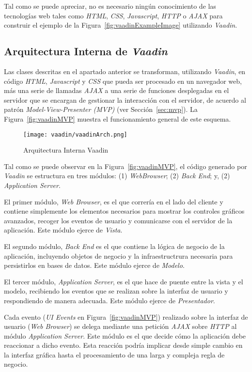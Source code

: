 Tal como se puede apreciar, no es necesario ningún conocimiento de las tecnologías web tales como \emph{HTML}, \emph{CSS}, \emph{Javascript}, \emph{HTTP} o \emph{AJAX} para construir el ejemplo de la Figura~\ref{fig:vaadinExampleImage} utilizando \emph{Vaadin}.

\subsection{Arquitectura Interna de \emph{Vaadin}}

Las clases descritas en el apartado anterior se transforman, utilizando \emph{Vaadin}, en código \emph{HTML}, \emph{Javascript} y \emph{CSS} que pueda ser procesado en un navegador web, más una serie de llamadas \emph{AJAX} a una serie de funciones desplegadas en el servidor que se encargan de gestionar la interacción con el servidor, de acuerdo al patrón \emph{Model-View-Presenter (MVP)} (ver Sección~\ref{sec:mvp}). La Figura~\ref{fig:vaadinMVP} muestra el funcionamiento general de este esquema.

\begin{figure}[!tb]
	\centering
	\texttt{[image: vaadin/vaadinArch.png]}
	\caption{Arquitectura Interna Vaadin}
	\label{fig:fig:vaadinMVP}
\end{figure}

Tal como se puede observar en la Figura~\ref{fig:vaadinMVP}, el código generado por \emph{Vaadin} se estructura en tres módulos: (1) \emph{WebBrowser}; (2) \emph{Back End}; y, (2) \emph{Application Server}.

El primer módulo, \emph{Web Browser}, es el que correría en el lado del cliente y contiene simplemente los elementos necesarios para mostrar los controles gráficos avanzados, recoger los eventos de usuario y comunicarse con el servidor de la aplicación. Este módulo ejerce de \emph{Vista}.

El segundo módulo, \emph{Back End} es el que contiene la lógica de negocio de la aplicación, incluyendo objetos de negocio y la infraestructrura necesaria para persistirlos en bases de datos. Este módulo ejerce de \emph{Modelo}.

El tercer módulo, \emph{Application Server}, es el que hace de puente entre la vista y el modelo, recibiendo los eventos que se realizan sobre la interfaz de usuario y respondiendo de manera adecuada. Este módulo ejerce de \emph{Presentador}.

Cada evento (\emph{UI Events} en Figura~\ref{fig:vaadinMVP}) realizado sobre la interfaz de usuario (\emph{Web Browser}) se delega mediante una petición \emph{AJAX} sobre \emph{HTTP} al módulo \emph{Application Server}. Este módulo es el que decide cómo la aplicación debe reaccionar a dicho evento. Esta reacción podría implicar desde simple cambio en la interfaz gráfica hasta el procesamiento de una larga y compleja regla de negocio. 

